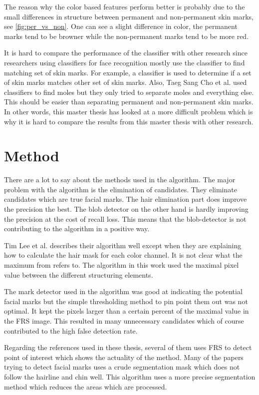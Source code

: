 The reason why the color based features perform better is probably due to the small differences in structure between permanent and non-permanent skin marks, see \cref{fig:per_vs_non}. One can see a slight difference in color, the permanent marks tend to be browner while the non-permanent marks tend to be more red.  

It is hard to compare the performance of the classifier with other research since researchers using classifiers for face recognition mostly use the classifier to find matching set of skin marks. For example, a classifier is used to determine if a set of skin marks matches other set of skin marks. Also, Taeg Sang Cho et al. used classifiers to find moles but they only tried to separate moles and everything else. This should be easier than separating permanent and non-permanent skin marks. In other words, this master thesis has looked at a more difficult problem which is why it is hard to compare the results from this master thesis with other research. 


\section{Method}

There are a lot to say about the methods used in the algorithm. The major problem with the algorithm is the elimination of candidates. They eliminate candidates which are true facial marks. The hair elimination part does improve the precision the best. The blob detector on the other hand is hardly improving the precision at the cost of recall loss. This means that the blob-detector is not contributing to the algorithm in a positive way.

Tim Lee et al. describes their algorithm well except when they are explaining how to calculate the hair mask for each color channel. It is not clear what the maximum from refers to. The algorithm in this work used the maximal pixel value between the different structuring elements. 

The mark detector used in the algorithm was good at indicating the potential facial marks but the simple thresholding method to pin point them out was not optimal. It kept the pixels larger than a certain percent of the maximal value in the FRS image. This resulted in many unnecessary candidates which of course contributed to the high false detection rate. 

Regarding the references used in these thesis, several of them uses FRS to detect point of interest which shows the actuality of the method. Many of the papers trying to detect facial marks uses a crude segmentation mask which does not follow the hairline and chin well. This algorithm uses a more precise segmentation method which reduces the areas which are processed. 


